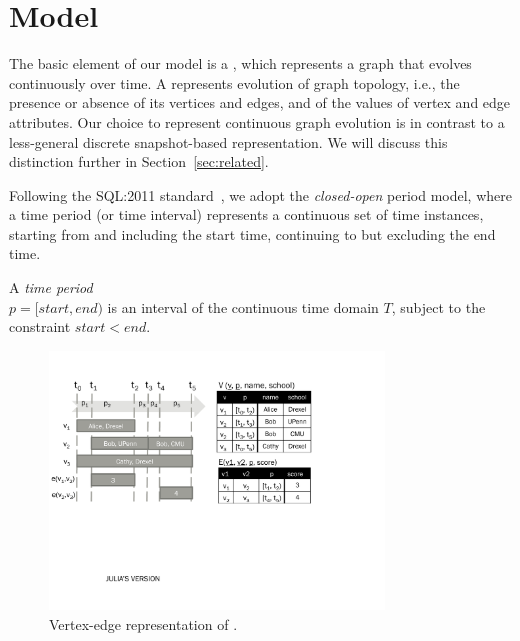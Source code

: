 \section{Model}
\label{sec:model}

The basic element of our model is a \tg, which represents a graph that
evolves continuously over time.  A \tg represents evolution of graph
topology, i.e., the presence or absence of its vertices and edges, and
of the values of vertex and edge attributes.  Our choice to represent
continuous graph evolution is in contrast to a less-general discrete
snapshot-based representation.  We will discuss this distinction
further in Section~\ref{sec:related}.

Following the SQL:2011
standard~\cite{DBLP:journals/sigmod/KulkarniM12}, we adopt the {\em
  closed-open} period model, where a time period (or time interval)
represents a continuous set of time instances, starting from and
including the start time, continuing to but excluding the end time.

\begin{definition}
A {\em time period} \\$p = [start, end)$ is an interval of the
  continuous time domain $T$, subject to the constraint $start < end$.
\label{def:period} 
\end{definition}

\begin{figure}
\centering
\includegraphics[width=3.5in]{figs/T1_rel_tab.pdf}
\caption{Vertex-edge representation of \tg {}.}
\label{fig:tg_ve}
\end{figure}


